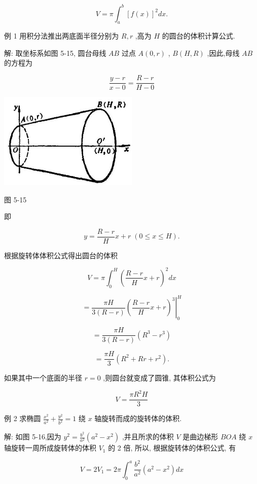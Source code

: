\documentclass[lang=cn,newtx,10pt,scheme=chinese]{elegantbook}
\begin{document}
\[
V = \pi {\int }_{a}^{b}{\left\lbrack f\left( x\right) \right\rbrack }^{2}{dx}.
\]

例 1 用积分法推出两底面半径分别为 \(R,r\) ,高为 \(H\) 的圆台的体积计算公式.

解: 取坐标系如图 5-15, 圆台母线 \({AB}\) 过点 \(A\left( {0,r}\right)\) , \(B\left( {H,R}\right)\) ,因此,母线 \({AB}\) 的方程为

\[
\frac{y - r}{x - 0} = \frac{R - r}{H - 0}
\]

\begin{center}
\includegraphics[max width=0.5\textwidth]{images/01912c18-5c3f-733d-b775-749ba9897a9d_237_214548.jpg}
\end{center}

图 5-15

即

\[
y = \frac{R - r}{H}x + r\;\left( {0 \leq x \leq H}\right) .
\]

根据旋转体体积公式得出圆台的体积

\[
V = \pi {\int }_{0}^{H}{\left( \frac{R - r}{H}x + r\right) }^{2}{dx}
\]

\[
= {\left. \frac{\pi H}{3\left( {R - r}\right) }{\left( \frac{R - r}{H}x + r\right) }^{3}\right| }_{0}^{H}
\]

\[
= \frac{\pi H}{3\left( {R - r}\right) }\left( {{R}^{3} - {r}^{3}}\right)
\]

\[
= \frac{\pi H}{3}\left( {{R}^{2} + {Rr} + {r}^{2}}\right) \text{.}
\]

如果其中一个底面的半径 \(r = 0\) ,则圆台就变成了圆锥, 其体积公式为

\[
V = \frac{\pi {R}^{2}H}{3}
\]

例 2 求椭圆 \(\frac{{x}^{2}}{{a}^{2}} + \frac{{y}^{2}}{{b}^{2}} = 1\) 绕 \(x\) 轴旋转而成的旋转体的体积.

解: 如图 5-16,因为 \({y}^{2} = \frac{{b}^{2}}{{a}^{2}}\left( {{a}^{2} - {x}^{2}}\right)\) ,并且所求的体积 \(V\) 是曲边梯形 \({BOA}\) 绕 \(x\) 轴旋转一周所成旋转体的体积 \({V}_{1}\) 的 2 倍, 所以, 根据旋转体的体积公式, 有

\[
V = 2{V}_{1} = {2\pi }{\int }_{0}^{a}\frac{{b}^{2}}{{a}^{2}}\left( {{a}^{2} - {x}^{2}}\right) {dx}
\]
\end{document}

